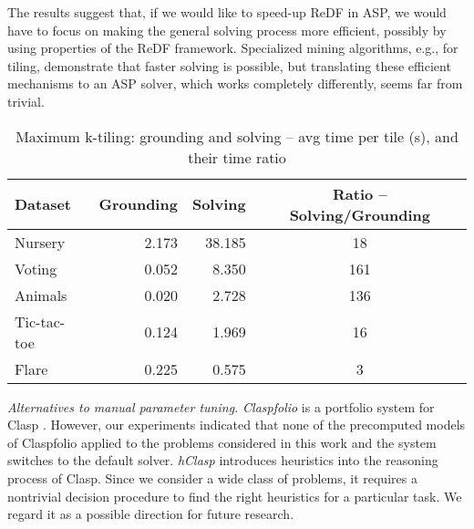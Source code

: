 The results suggest that, if we would like to speed-up ReDF in ASP, we would have to focus on making the general solving process more efficient, possibly by using properties of the ReDF framework. Specialized mining algorithms, e.g., for tiling, demonstrate that faster solving is possible, but translating these efficient mechanisms to an ASP solver, which works completely differently, seems far from trivial.

\begin{table}\footnotesize
  \caption{Maximum k-tiling: grounding and solving -- avg time per tile (s), and their time ratio}
  \label{table:steps-time}
\vspace{-10pt}
\begin{center}
\begin{tabular}{lrrc}
  Dataset & Grounding & \phantom{text} Solving & \phantom{aaa} Ratio -- Solving/Grounding \\ \hline
Nursery     &2.173&38.185 & 18 \\
Voting      &0.052&8.350 & 161  \\
Animals     &0.020&2.728 & 136 \\
Tic-tac-toe &0.124&1.969 & 16  \\
Flare       &0.225&0.575 & 3
\end{tabular}
\end{center}
\end{table}

\textit{Alternatives to manual parameter tuning.} \textit{Claspfolio} is a portfolio system for Clasp \parencite{gekakascsczi11a}. However, our experiments indicated that none of the precomputed models of Claspfolio applied to the problems considered in this work and the system switches to the default solver. \textit{hClasp} \parencite{conf/aaai/GebserKROSW13} introduces heuristics into the reasoning process of Clasp. Since we consider a wide class of problems, it requires a nontrivial decision procedure to find the right heuristics for a particular task. We regard it as a possible direction for future research.

